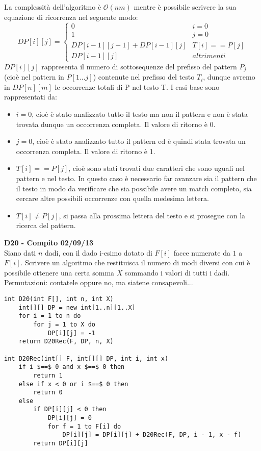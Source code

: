 \documentclass[../cheatSheetAlgoritmi.tex]{subfiles}
\begin{document}
La complessità dell'algoritmo è $\mathcal{O}(nm)$ mentre è possibile scrivere la sua equazione di ricorrenza nel seguente modo:
\begin{equation*}
  	DP[i][j] =\begin{cases}
    	0 & \text{$i = 0$}\\
    	1 & \text{$j = 0$}\\
    	DP[i-1][j-1] + DP[i-1][j] & \text{$T[i] == P[j]$}\\
    	DP[i-1][j] & \text{$altrimenti$}
  	\end{cases}
\end{equation*}
$DP[i][j]$ rappresenta il numero di sottosequenze del prefisso del pattern $P_{j}$ (cioè nel pattern in $P[1...j]$) contenute nel prefisso del testo $T_{i}$, dunque avremo in $DP[n][m]$ le occorrenze totali di P nel testo T. I casi base sono rappresentati da:
\begin{itemize}
	\item $i = 0$, cioè è stato analizzato tutto il testo ma non il pattern e non è stata trovata dunque un occorrenza completa. Il valore di ritorno è 0.
	\item $j = 0$, cioè è stato analizzato tutto il pattern ed è quindi stata trovata un occorrenza completa. Il valore di ritorno è 1.
	\item $T[i] == P[j]$, cioè sono stati trovati due caratteri che sono uguali nel pattern e nel testo. In questo caso è necessario far avanzare sia il pattern che il testo in modo da verificare che sia possibile avere un match completo, sia cercare altre possibili occorrenze con quella medesima lettera.
	\item $T[i] \neq P[j]$, si passa alla prossima lettera del testo e si prosegue con la ricerca del pattern.
\end{itemize}
\textbf{D20 - Compito 02/09/13}\\
Siano dati $n$ dadi, con il dado i-esimo dotato di $F[i]$ facce numerate da $1$ a $F[i]$. Scrivere un algoritmo che restituisca il numero di modi diversi con cui è possibile ottenere una certa somma $X$ sommando i valori di tutti i dadi. Permutazioni: contatele oppure no, ma siatene consapevoli...
\begin{lstlisting}[caption= D20 con permutazioni]
int D20(int F[], int n, int X)
    int[][] DP = new int[1..n][1..X]
    for i = 1 to n do
        for j = 1 to X do
            DP[i][j] = -1
    return D20Rec(F, DP, n, X)

int D20Rec(int[] F, int[][] DP, int i, int x)
    if i $==$ 0 and x $==$ 0 then
        return 1
    else if x < 0 or i $==$ 0 then
        return 0
    else
        if DP[i][j] < 0 then
            DP[i][j] = 0
            for f = 1 to F[i] do
                DP[i][j] = DP[i][j] + D20Rec(F, DP, i - 1, x - f)
        return DP[i][j]
\end{lstlisting}
\end{document}
